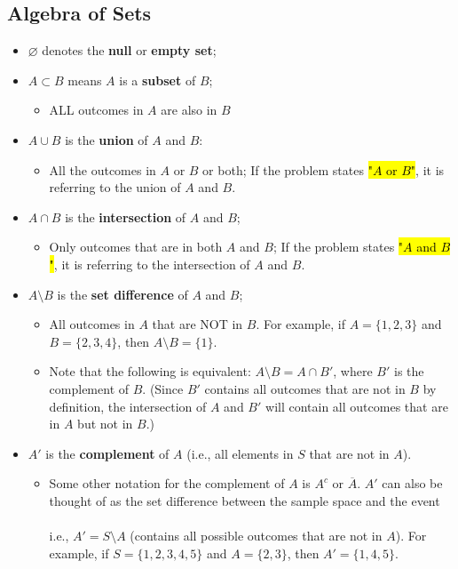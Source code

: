 ﻿\documentclass[12pt]{article}
\begin{document}
\subsection*{Algebra of Sets}
\begin{itemize}
    \item $\varnothing$ denotes the \textbf{null} or \textbf{empty set};
    \item $A \subset B$ means $A$ is a \textbf{subset} of $B$;
    \begin{itemize}
        \item ALL outcomes in $A$ are also in $B$
    \end{itemize}
    \item $A \cup B$ is the \textbf{union} of $A$ and $B$:
    \begin{itemize}
        \item All the outcomes in $A$ or $B$ or both; If the problem states \hl{"$A$ or $B$"}, it is referring to the union of $A$ and $B$.
    \end{itemize}
    \item $A \cap B$ is the \textbf{intersection} of $A$ and $B$;
    \begin{itemize}
        \item Only outcomes that are in both $A$ and $B$; If the problem states \hl{"$A$ and $B$"}, it is referring to the intersection of $A$ and $B$.
    \end{itemize}
    \item $A \setminus B$ is the \textbf{set difference} of $A$ and $B$;
    \begin{itemize}
        \item All outcomes in $A$ that are NOT in $B$. For example, if $A = \{1, 2, 3\}$ and $B = \{2, 3, 4\}$, then $A \setminus B = \{1\}$.
        \item Note that the following is equivalent: $A \setminus B = A \cap B'$, where $B'$ is the complement of $B$. (Since $B'$ contains all outcomes that are not in $B$ by definition, the intersection of $A$ and $B'$ will contain all outcomes that are in $A$ but not in $B$.)
    \end{itemize}
    \item $A'$ is the \textbf{complement} of $A$ (i.e., all elements in $S$ that are not in $A$).
    \begin{itemize}
        \item Some other notation for the complement of $A$ is $A^c$ or $\overline{A}$. $A'$ can also be thought of as the set difference between the sample space and the event\\\\
        i.e., $A' = S \setminus A$ (contains all possible outcomes that are not in $A$). For example, if $S = \{1, 2, 3, 4, 5\}$ and $A = \{2, 3\}$, then $A' = \{1, 4, 5\}$.
    \end{itemize}
\end{itemize}
\end{document}

